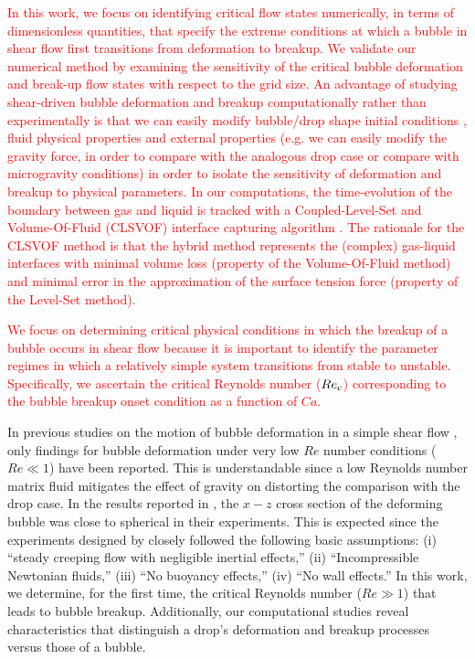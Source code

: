 \documentclass{elsarticle}
\begin{document}
\textcolor{red} {
In this work, we focus on identifying critical flow states numerically, in terms of dimensionless quantities, that specify the extreme conditions at which a bubble in shear flow first transitions from deformation to breakup.  We validate our numerical method by examining the sensitivity of the critical bubble deformation and break-up flow states with respect to the grid size.  An advantage of studying shear-driven bubble deformation and breakup computationally rather than experimentally is that we can easily modify bubble/drop shape initial conditions \cite{ohta2005computational}, fluid physical properties and external properties (e.g. we can easily modify the gravity force, in order to compare with the analogous drop case or compare with microgravity conditions) in order to isolate the sensitivity of deformation and breakup to physical parameters.  In our computations, the time-evolution of the boundary between gas and liquid is tracked with a Coupled-Level-Set and Volume-Of-Fluid (CLSVOF) interface capturing algorithm \cite{SusPuc00,SusSmiHusOhtZhi07}.  The rationale for the CLSVOF method is that the hybrid method represents the (complex) gas-liquid interfaces with minimal volume loss (property of the Volume-Of-Fluid method) and minimal error in the approximation of the surface tension force (property of the Level-Set method).
}
\par
\textcolor{red} {
We focus on determining critical physical conditions in which the breakup of a bubble occurs in shear flow because it is important to identify the parameter regimes in which a relatively simple system transitions from stable to unstable.  Specifically, we ascertain the critical Reynolds number ($Re_{\rm c}$) corresponding to the bubble breakup onset condition as a function of $Ca$.  
}
\par
In previous studies on the motion of bubble deformation in a simple shear flow \cite{CanedoETAL,RusMan02, MulTobDreFisWin08}, only findings for bubble deformation under very low $Re$ number conditions ($Re \ll 1$) have been reported.  This is understandable since a low Reynolds number matrix fluid mitigates the effect of gravity on distorting the comparison with the drop case.  In the results reported in \cite{CanedoETAL}, the $x-z$ cross section of the deforming bubble was close to spherical in their experiments.  This is expected since the experiments designed by \cite{CanedoETAL} closely followed the following basic assumptions: (i) ``steady creeping flow with negligible inertial effects,'' (ii) ``Incompressible Newtonian fluids,'' (iii) ``No buoyancy effects,'' (iv) ``No wall effects.''  In this work, we determine, for the first time, the critical Reynolds number ($Re \gg 1$) that leads to bubble breakup.  Additionally, our computational studies reveal characteristics that distinguish a drop's deformation and breakup processes versus those of a bubble.
\end{document}
